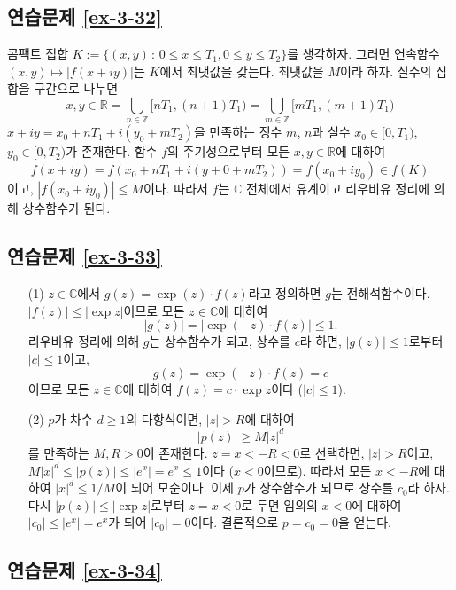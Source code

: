 \subsection*{연습문제 \ref{ex-3-32}}

콤팩트 집합 $K:=\{ (x,y) \,:\, 0\le x\le T_1, 0\le y \le T_2\}$를 생각하자.
그러면 연속함수 $(x,y)\mapsto |f(x+iy)|$는 $K$에서 최댓값을 갖는다. 
최댓값을  $M$이라 하자. 
실수의 집합을 구간으로 나누면
\[
x,y\in\mathbb R = \bigcup_{n\in\mathbb Z} [ nT_1, (n+1)T_1)
= \bigcup_{m\in\mathbb Z} [ mT_1, (m+1)T_1)
\]
$x+iy = x_0 +nT_1 + i(y_0+mT_2)$을 만족하는 정수 $m$, $n$과
실수 $x_0\in [0,T_1)$, $y_0\in [0,T_2)$가 존재한다.
함수 $f$의 주기성으로부터 모든 $x,y\in\mathbb R$에 대하여
\[
f(x+iy) = f(x_0+nT_1 + i(y+0+mT_2)) = f(x_0+iy_0) \in f(K)
\]
이고, $|f(x_0+iy_0)| \le M$이다.
따라서 $f$는 $\mathbb C$ 전체에서 유계이고
리우비유 정리에 의해 상수함수가 된다.

\subsection*{연습문제 \ref{ex-3-33}}

\begin{itemize}
\item[(1)] $z\in\mathbb C$에서 $g(z)=\exp(z)\cdot f(z)$라고 정의하면
$g$는 전해석함수이다. $|f(z)| \le|\exp z|$이므로 모든 $z\in\mathbb C$에 대하여
\[
|g(z)| =| \exp(-z)\cdot f(z)| \le 1.
\]
리우비유 정리에 의해 $g$는 상수함수가 되고, 상수를 $c$라 하면,
$|g(z)|\le1$로부터 $|c|\le1$이고,
\[
g(z) = \exp(-z)\cdot f(z) = c
\]
이므로 모든 $z\in\mathbb C$에 대하여 $f(z)  = c\cdot \exp z$이다 ($|c|\le1$).

\item[(2)] $p$가 차수 $d\ge1$의 다항식이면,
$|z|>R$에 대하여
\[
|p(z)| \ge M|z|^d
\]
를 만족하는 $M, R>0$이 존재한다.
$z=x <  -R <0$로 선택하면,
$|z|>R$이고, $M|x|^d \le |p(z)| \le |e^x| = e^x \le 1$이다 ($x<0$이므로).
따라서 모든 $x<-R$에 대하여 $|x|^d \le 1/M$이 되어 모순이다.
이제 $p$가 상수함수가 되므로 상수를 $c_0$라 하자.
다시 $|p(z)| \le |\exp z|$로부터 $z=x<0$로 두면
임의의 $x<0$에 대하여
$|c_0| \le |e^x| = e^x$가 되어 $|c_0|=0$이다.
결론적으로 $p=c_0=0$을 얻는다.
\end{itemize}

\subsection*{연습문제 \ref{ex-3-34}}

